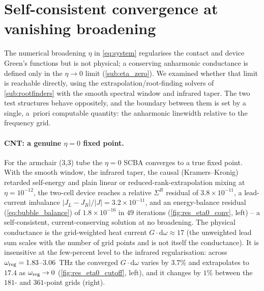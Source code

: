 \section{Self-consistent convergence at vanishing broadening}
\label{sec:res_eta0}

The numerical broadening $\eta$ in \cref{eq:system} regularises the contact and
device Green's functions but is not physical; a conserving anharmonic
conductance is defined only in the $\eta\to0$ limit (\cref{sub:eta_zero}). We
examined whether that limit is reachable directly, using the
extrapolation/root-finding solvers of \cref{sub:rootfinders} with the smooth
spectral window and infrared taper. The two test structures behave oppositely,
and the boundary between them is set by a single, a~priori computable quantity:
the anharmonic linewidth relative to the frequency grid.

\paragraph{CNT: a genuine $\eta=0$ fixed point.}
For the armchair (3,3) tube the $\eta=0$ SCBA converges to a true fixed point.
With the smooth window, the infrared taper, the causal (Kramers--Kronig)
retarded self-energy and plain linear or reduced-rank-extrapolation mixing at
$\eta=10^{-12}$, the two-cell device reaches a relative $\Sigma^R$ residual of
$3.8\times10^{-11}$, a lead-current imbalance
$|J_L-J_R|/|J|=3.2\times10^{-11}$, and an energy-balance residual
(\cref{eq:bubble_balance}) of $1.8\times10^{-16}$ in $49$ iterations
(\cref{fig:res_eta0_conv}, left) -- a self-consistent, current-conserving
solution at no broadening. The physical conductance is the grid-weighted heat
current $G\cdot\mathrm{d}\omega\approx 17$ (the unweighted lead sum scales with
the number of grid points and is not itself the conductance). It is insensitive
at the few-percent level to the infrared regularisation: across
$\omega_{\rm reg}=1.83$--$3.06$~THz the converged $G\cdot\mathrm{d}\omega$ varies
by $3.7\%$ and extrapolates to $17.4$ as $\omega_{\rm reg}\to0$
(\cref{fig:res_eta0_cutoff}, left), and it changes by $1\%$ between the $181$-
and $361$-point grids (right).

